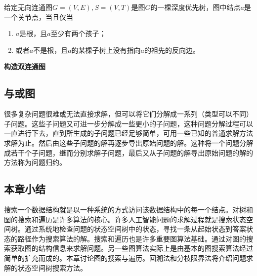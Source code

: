 给定无向连通图$G=(V,E),S=(V,T)$是图$G$的一棵深度优先树，图中结点$a$是一个关节点，当且仅当
\begin{enumerate}
	\item $a$是根，且$a$至少有两个孩子；
	\item 或者$a$不是根，且$a$的某棵子树上没有指向$a$的祖先的反向边。
\end{enumerate}

\textbf{构造双连通图}
\subsection*{与或图}
很多复杂问题很难或无法直接求解，但可以将它们分解成一系列（类型可以不同）子问题。这些子问题又可进一步分解成一些更小的子问题，这种问题分解过程可以一直进行下去，直到所生成的子问题已经足够简单，可用一些已知的普通求解方法求解为止。然后由这些子问题的解再逐步导出原始问题的解。这种将一个问题分解成若干个子问题，继而分别求解子问题，最后又从子问题的解导出原始问题的解的方法称为问题归约。

\subsection*{本章小结}
搜索一个数据结构就是以一种系统的方式访问该数据结构中的每一个结点。对树和图的搜索和遍历是许多算法的核心。许多人工智能问题的求解过程就是搜索状态空间树。通过系统地检查问题的状态空间树中的状态，寻找一条从起始状态到答案状态的路径作为搜索算法的解。搜索和遍历也是许多重要图算法基础。通过对图的搜索获取图的结构信息来求解问题。另一些图算法实际上是由基本的图搜索算法经过简单的扩充而成的。本章讨论图的搜索与遍历。回溯法和分枝限界法将介绍问题求解的状态空间树搜索方法。